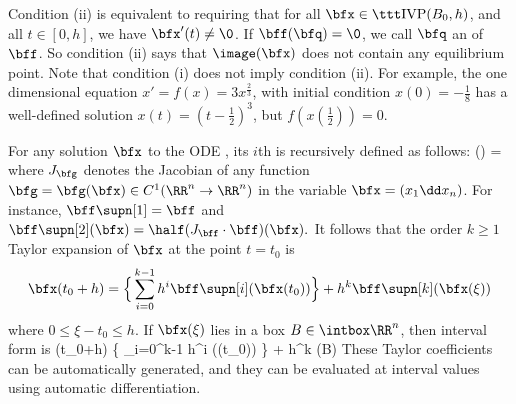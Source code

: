	  
	Condition (ii) is equivalent to requiring that
	for all $\bfx\in \ivp(B_0,h)$, and all $t \in [0, h]$,  
	we have $\bfx'(t) \neq \0$.
	If $\bff(\bfq)=\0$, we call $\bfq$
	an  of $\bff$.  So condition (ii)
	says that $\image(\bfx)$ does not contain any equilibrium
	point.
	Note that condition (i) does not imply condition
	(ii). For example, the one dimensional equation  
	  $x' = f(x) = 3x^{\frac{2}{3}}$,  
	  with initial condition $x(0) = -\frac{1}{8}$ has a
	  well-defined solution $x(t) = (t - \frac{1}{2})^3$, 
	  but $f(x(\frac{1}{2})) = 0$.  



	For any solution $\bfx$ to the
	ODE , its $i$th 
	is recursively defined as follows:
			\bff\supn[i](\bfx) =
		\eeql
	where $J_\bfg$ denotes the Jacobian of any function
	$\bfg=\bfg(\bfx)\in C^1(\RR^n\to\RR^n)$
	in the variable $\bfx=(x_1\dd x_n)$.
	For instance,
		$\bff\supn[1] = \bff$
	and
		$\bff\supn[2](\bfx) = \half (J_\bff\cdot \bff)(\bfx).$
	It follows that the order $k\ge 1$ Taylor expansion of $\bfx$
	at the point $t=t_0$ is
		$$\bfx(t_0+h) = \Big\{
				\sum_{i=0}^{k-1} h^i \bff\supn[i](\bfx(t_0)) \Big\}
					+ h^k \bff\supn[k](\bfx(\xi))
		$$
	where $0\le \xi-t_0 \le h$. 
	If $\bfx(\xi)$ lies in a box $B\in\intbox\RR^n$,
	then interval form is
			\bfx(t_0+h) \in \Big\{
				\sum_{i=0}^{k-1} h^i \bff\supn[i](\bfx(t_0)) \Big\}
					+ h^k \bff\supn[k](B) \eeql
	These Taylor coefficients
	can be automatically generated, and they can be evaluated
	at interval values using automatic
	differentiation. %

